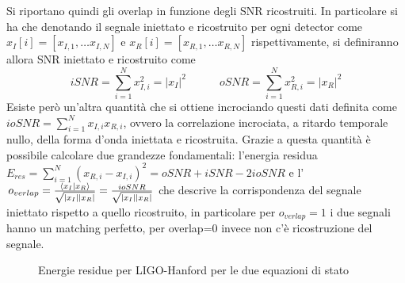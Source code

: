 Si riportano quindi gli overlap in funzione degli SNR ricostruiti. In particolare si ha che denotando il segnale iniettato e ricostruito per ogni detector come $x_{I}[i]= [x_{I,1}, \dots x_{I,N}]$ e $x_{R}[i]= [x_{R,1}, \dots x_{R,N}]$ rispettivamente, si definiranno allora SNR iniettato e ricostruito come
\begin{equation}
	iSNR = \sum_{i=1}^{N}x_{I, i}^2 = |x_{I}|^2 \quad\quad\quad oSNR = \sum_{i=1}^{N}x_{R, i}^2 = |x_{R}|^2
	\label{eqn:iSNR_oSNR}
\end{equation} 
Esiste però un'altra quantità che si ottiene incrociando questi dati definita come $ioSNR = \sum_{i=1}^{N}x_{I, i}x_{R, i}$, ovvero la correlazione incrociata, a ritardo temporale nullo, della forma d'onda iniettata e ricostruita. Grazie a questa quantità è possibile calcolare due grandezze fondamentali: l'energia residua $E_{res}= \sum_{i=1}^{N}(x_{R, i}-x_{I, i})^2 = oSNR + iSNR - 2ioSNR$ e l'$o_{verlap} = \frac{\braket{x_I}{x_R}}{\sqrt{|x_I||x_R|}} = \frac{ioSNR}{\sqrt{|x_I||x_R|}}$ che descrive la corrispondenza del segnale iniettato rispetto a quello ricostruito, in particolare per $o_{verlap}=1$ i due segnali hanno un matching perfetto, per overlap=0 invece non c'è ricostruzione del segnale.
\begin{figure}[H]
	\vspace{-20pt}
	\centering
	\vspace{-5pt}
	\caption{Energie residue per LIGO-Hanford per le due equazioni di stato}
	\label{fig:residual_energy}
	\vspace{-15pt}
\end{figure}
